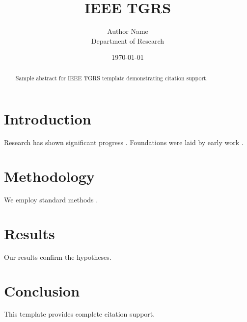 ﻿\documentclass{IEEEtran}
\title{IEEE TGRS}
\author{Author Name \\ \small Department of Research}
\date{\today}
\begin{document}
\maketitle

\begin{abstract}
Sample abstract for IEEE TGRS template demonstrating citation support.
\end{abstract}

\section{Introduction}
Research has shown significant progress \citep{einstein1905}. Foundations were laid by early work \citep{turing1950}.

\section{Methodology}
We employ standard methods \citep{knuth1984}.

\section{Results}
Our results confirm the hypotheses.

\section{Conclusion}
This template provides complete citation support.



\end{document}
